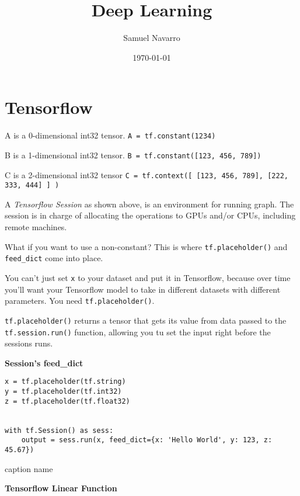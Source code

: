 \documentclass[11pt, a4paper]{article}
\begin{document}
\title{Deep Learning}
\author{Samuel Navarro}
\date{\today}
\maketitle

\tableofcontents


\section{Tensorflow}%
\label{sec:tensorflow}


A is a 0-dimensional int32 tensor.
\texttt{A = tf.constant(1234)}

B is a 1-dimensional int32 tensor.
\texttt{B = tf.constant([123, 456, 789])}

C is a 2-dimensional int32 tensor
\texttt{C = tf.context([ [123, 456, 789], [222, 333, 444] ] ) }


A \textit{Tensorflow Session} as shown above, is an environment for running graph. The session is in charge of allocating the operations to GPUs and/or CPUs, including remote machines. 

What if you want to use a non-constant? This is where \texttt{tf.placeholder()} and \texttt{feed\_dict} come into place.

You can't just set \texttt{x} to your dataset and put it in Tensorflow, because over time you'll want your Tensorflow model to take in different datasets with different parameters. You need \texttt{tf.placeholder()}.

\texttt{tf.placeholder()} returns a tensor that gets its value from data passed to the \texttt{tf.session.run()} function, allowing you tu set the input right before the sessions runs. 

\textbf{Session's feed\_dict}

\begin{listing}
\begin{verbatim}
x = tf.placeholder(tf.string)
y = tf.placeholder(tf.int32)
z = tf.placeholder(tf.float32)


with tf.Session() as sess:
	output = sess.run(x, feed_dict={x: 'Hello World', y: 123, z: 45.67})
\end{verbatim}
\caption{caption name}
\label{lst:caption_name}
\end{listing}



\textbf{Tensorflow Linear Function} 
\end{document}
